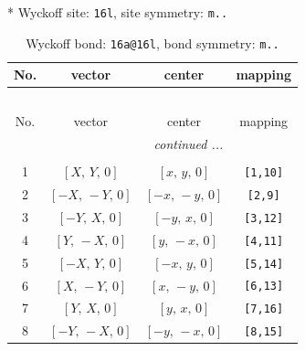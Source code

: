 \documentclass[fleqn,8pt]{jsarticle}
\begin{document}
* Wyckoff site: {\tt 16l}, site symmetry: {\tt m..}
\renewcommand{\arraystretch}{1.2}
\begin{longtable}{cccc}
\caption{Wyckoff bond: {\tt 16a@16l}, bond symmetry: {\tt m..}}
 \\
 \hline \hline
No. & vector & center & mapping \\ \hline \endfirsthead

\multicolumn{3}{l}{\tablename\ \thetable{}} \\
 \hline \hline
No. & vector & center & mapping \\ \hline \endhead

 \hline \hline
\multicolumn{3}{r}{\footnotesize\it continued ...} \\ \endfoot

 \hline \hline
\multicolumn{3}{r}{} \\ \endlastfoot

1 & $\left[ X,\, Y,\, 0 \right]$ & $\left[ x,\, y,\, 0 \right]$ & {\tt [1,10]} \\ \hline
2 & $\left[ - X,\, - Y,\, 0 \right]$ & $\left[ - x,\, - y,\, 0 \right]$ & {\tt [2,9]} \\ \hline
3 & $\left[ - Y,\, X,\, 0 \right]$ & $\left[ - y,\, x,\, 0 \right]$ & {\tt [3,12]} \\ \hline
4 & $\left[ Y,\, - X,\, 0 \right]$ & $\left[ y,\, - x,\, 0 \right]$ & {\tt [4,11]} \\ \hline
5 & $\left[ - X,\, Y,\, 0 \right]$ & $\left[ - x,\, y,\, 0 \right]$ & {\tt [5,14]} \\ \hline
6 & $\left[ X,\, - Y,\, 0 \right]$ & $\left[ x,\, - y,\, 0 \right]$ & {\tt [6,13]} \\ \hline
7 & $\left[ Y,\, X,\, 0 \right]$ & $\left[ y,\, x,\, 0 \right]$ & {\tt [7,16]} \\ \hline
8 & $\left[ - Y,\, - X,\, 0 \right]$ & $\left[ - y,\, - x,\, 0 \right]$ & {\tt [8,15]} \\
\end{longtable}
\renewcommand{\arraystretch}{1.2}
\end{document}
